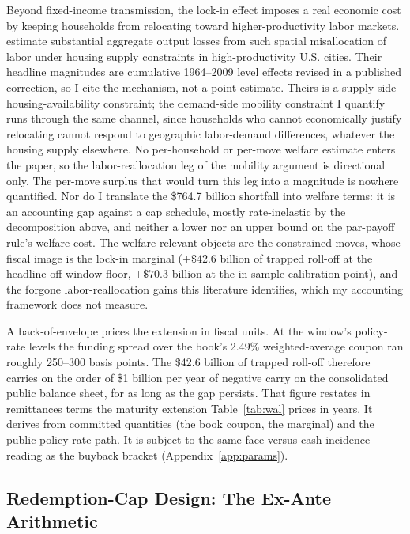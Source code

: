 \documentclass[12pt]{article}
\begin{document}
Beyond fixed-income transmission, the lock-in effect imposes a real economic cost by keeping households from relocating toward higher-productivity labor markets. \citet{hsieh2019} estimate substantial aggregate output losses from such spatial misallocation of labor under housing supply constraints in high-productivity U.S. cities. Their headline magnitudes are cumulative 1964--2009 level effects revised in a published correction, so I cite the mechanism, not a point estimate. Theirs is a supply-side housing-availability constraint; the demand-side mobility constraint I quantify runs through the same channel, since households who cannot economically justify relocating cannot respond to geographic labor-demand differences, whatever the housing supply elsewhere. No per-household or per-move welfare estimate enters the paper, so the labor-reallocation leg of the mobility argument is directional only. The per-move surplus that would turn this leg into a magnitude is nowhere quantified. Nor do I translate the \$764.7 billion shortfall into welfare terms: it is an accounting gap against a cap schedule, mostly rate-inelastic by the decomposition above, and neither a lower nor an upper bound on the par-payoff rule's welfare cost. The welfare-relevant objects are the constrained moves, whose fiscal image is the lock-in marginal ($+\$42.6$ billion of trapped roll-off at the headline off-window floor, $+\$70.3$ billion at the in-sample calibration point), and the forgone labor-reallocation gains this literature identifies, which my accounting framework does not measure.

A back-of-envelope prices the extension in fiscal units. At the window's policy-rate levels the funding spread over the book's 2.49\% weighted-average coupon ran roughly 250--300 basis points. The \$42.6 billion of trapped roll-off therefore carries on the order of \$1 billion per year of negative carry on the consolidated public balance sheet, for as long as the gap persists. That figure restates in remittances terms the maturity extension Table~\ref{tab:wal} prices in years. It derives from committed quantities (the book coupon, the marginal) and the public policy-rate path. It is subject to the same face-versus-cash incidence reading as the buyback bracket (Appendix~\ref{app:params}).

\subsection{Redemption-Cap Design: The Ex-Ante Arithmetic}\label{sec:discussion-capdesign}
\end{document}
